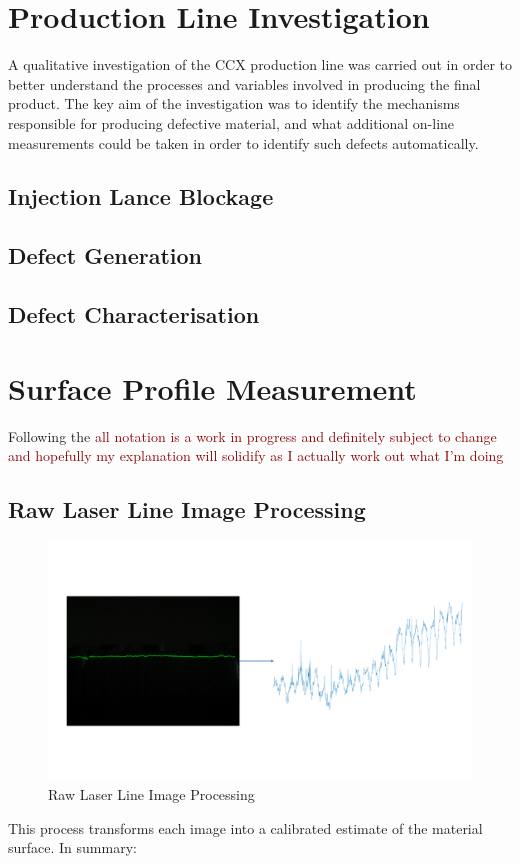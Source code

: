 \documentclass[12pt]{report}
\newcommand{\tcr}[1]{\textcolor{darkRed}{#1}}
\begin{document}
\chapter{Production Line Investigation}
    A qualitative investigation of the CCX production line was carried out in order to better understand the processes and variables involved in producing the final product. The key aim of the investigation was to identify the mechanisms responsible for producing defective material, and what additional on-line measurements could be taken in order to identify such defects automatically.
    
    \section{Injection Lance Blockage}
        
    \section{Defect Generation}
        
    \section{Defect Characterisation}
    

\chapter{Surface Profile Measurement}
    Following the 
    \tcr{all notation is a work in progress and definitely subject to change and hopefully my explanation will solidify as I actually work out what I'm doing}
    \section{Raw Laser Line Image Processing}
        \begin{figure}[ht!]
            \centering
            \includegraphics[width=\textwidth,trim={0 5cm 0 5cm},clip]{figures/profile_measure/temp_height_measure.pdf}
            \caption{Raw Laser Line Image Processing}
        \end{figure}
        This process transforms each image into a calibrated estimate of the material surface. In summary:
        
\end{document}
